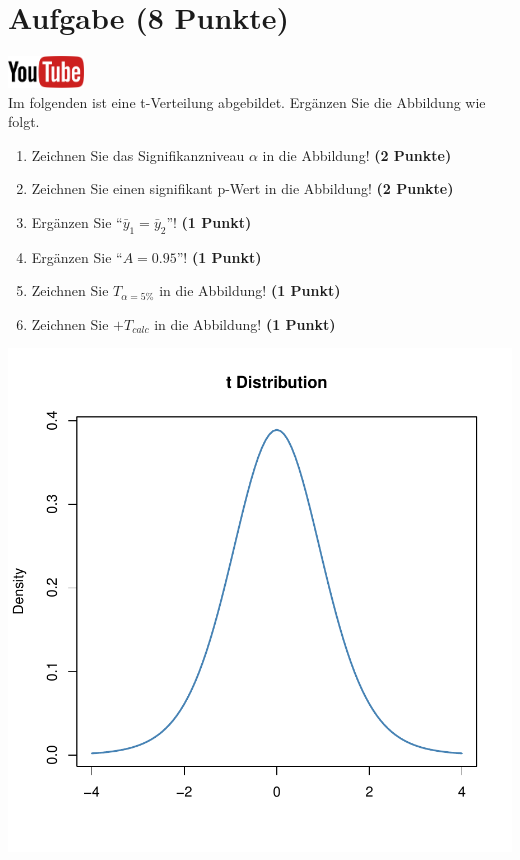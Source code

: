 \documentclass[a4paper, 10pt]{scrartcl}\usepackage[]{graphicx}\usepackage[]{xcolor}
\makeatletter
\def\maxwidth{ %
  \ifdim\Gin@nat@width>\linewidth
    \linewidth
  \else
    \Gin@nat@width
  \fi
}
\makeatother
\begin{document}
 
\clearpage

\section{Aufgabe \hfill (8 Punkte)}

\hfill\href{https://youtu.be/32JjH1eyuTU}{\includegraphics[width =
  2cm]{img/youtube}}\\[1Ex]



Im folgenden ist eine t-Verteilung abgebildet. Erg{\"a}nzen Sie die Abbildung wie folgt.

\begin{enumerate}
\item Zeichnen Sie das Signifikanzniveau $\alpha$ in die Abbildung! \textbf{(2 Punkte)} 
\item Zeichnen Sie einen signifikant p-Wert in die Abbildung! \textbf{(2 Punkte)} 
\item Erg{\"a}nzen Sie "`$\bar{y}_1 = \bar{y}_2$"'! \textbf{(1 Punkt)} 
\item Erg{\"a}nzen Sie "`$A = 0.95$"'! \textbf{(1 Punkt)}
\item Zeichnen Sie $T_{\alpha=5\%}$ in die Abbildung! \textbf{(1 Punkt)} 
\item Zeichnen Sie $+T_{calc}$ in die Abbildung! \textbf{(1 Punkt)} 
\end{enumerate}



{\centering \includegraphics[width=\maxwidth]{img/statistisches-testen-3-1} 

}
\end{document}
